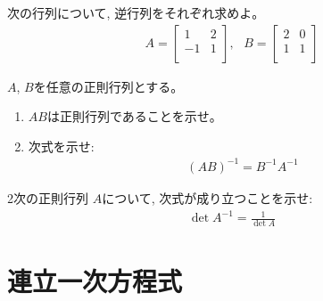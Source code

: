 \begin{q}\label{q:matrix_AinvBinv2D} 次の行列について, 逆行列をそれぞれ求めよ。
\begin{eqnarray*}
A=\begin{bmatrix}
1 & 2 \\
-1 & 1 \\
\end{bmatrix}
,\,\,\,\, 
B=\begin{bmatrix}
2 & 0 \\
1 & 1 \\
\end{bmatrix}
\end{eqnarray*}
\end{q}\mv

\begin{q}\label{q:matrix_regular2D} $A$, $B$を任意の正則行列とする。
\begin{enumerate}
\item $AB$は正則行列であることを示せ。
\item 次式を示せ:
\begin{eqnarray}
(AB)^{-1}=B^{-1}A^{-1}
\end{eqnarray}
\end{enumerate}\end{q}
\mv

\begin{q}\label{q:matrix_det_inv2D} 2次の正則行列
$A$について, 次式が成り立つことを示せ:
\begin{eqnarray}
\det A^{-1}=\frac{1}{\det A}\label{q:matrix_det_inv}
\end{eqnarray}
\end{q}
\vv



\section{連立一次方程式}

